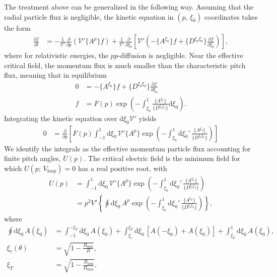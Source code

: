 \documentclass[11pt,a4paper]{article}
\newcommand{\rd}{\ensuremath{\mathrm{d}}}
\newcommand{\sub}[1]{\ensuremath{_{\text{#1}}}}
\begin{document}
The treatment above can be generalized in the following way. Assuming that the radial particle flux is negligible, the kinetic equation in $(p,\,\xi_0)$ coordinates takes the form
\begin{align}
\frac{\partial f}{\partial t} &= -\frac{1}{\mathcal{V}'}\frac{\partial}{\partial p}\left(\mathcal{V'} \{A^p\}f\right) + \frac{1}{\mathcal{V}'}\frac{\partial}{\partial \xi_0}\left[\mathcal{V'}\left( -\{A^{\xi_0}\}f + \{D^{\xi_0\xi_0}\} \frac{\partial f}{\partial \xi_0}\right)\right],
\end{align}
where for relativistic energies, the $pp$-diffusion is negligible. Near the effective critical field, the momentum flux is much smaller than the characteristic pitch flux, meaning that in equilibrium
\begin{align}
0 &= -\{A^{\xi_0}\}f + \{D^{\xi_0\xi_0}\} \frac{\partial f}{\partial \xi_0} \nonumber \\
f &= F(p) \exp\left( -\int_{\xi_0}^1 \frac{\{A^{\xi_0}\}}{\{D^{\xi_0\xi_0}\}} \rd \xi_0 \right).
\end{align}
Integrating the kinetic equation over $\rd \xi_0 \mathcal{V'}$ yields
\begin{align}
0 &= \frac{\partial}{\partial p} \left[ F(p) \int_{-1}^1 \rd \xi_0 \, \mathcal{V}'  \{A^p\} \exp\left( -\int_{\xi_0}^1\rd \xi_0' \,\frac{\{A^{\xi_0}\}}{\{D^{\xi_0\xi_0}\}} \right)\right]
\end{align}
We identify the integrals as the effective momentum particle flux accounting for finite pitch angles, $U(p)$. The critical electric field is the minimum field for which $U(p;\,V\sub{loop})=0$ has a real positive root, with
\begin{align}
U(p) &=  \int_{-1}^1 \rd \xi_0 \, \mathcal{V}'  \{A^p\} \exp\left( -\int_{\xi_0}^1 \rd \xi_0' \, \frac{\{A^{\xi_0}\}}{\{D^{\xi_0\xi_0}\}} \right) \nonumber \\
&= p^2V' \left \{  \oint \rd \xi_0 \, A^p\exp\left( -\int_{\xi_0}^1 \rd \xi_0' \, \frac{\{A^{\xi_0}\}}{\{D^{\xi_0\xi_0}\}} \right)  \right \},
\end{align}
where
\begin{align}
\oint \rd \xi_0 \, A(\xi_0) &= \int_{-1}^{-\xi_T} \rd \xi_0 \, A(\xi_0)+ \int_{\xi_c}^{\xi_T} \rd\xi_0 \, [A(-\xi_0) + A(\xi_0)] + \int_{\xi_T}^1 \rd \xi_0 \, A(\xi_0), \nonumber \\
\xi_c(\theta) &= \sqrt{1-\frac{B\sub{min}}{B}}, \nonumber \\
\xi_T &= \sqrt{1-\frac{B\sub{min}}{B\sub{max}}},
\end{align}
\end{document}
